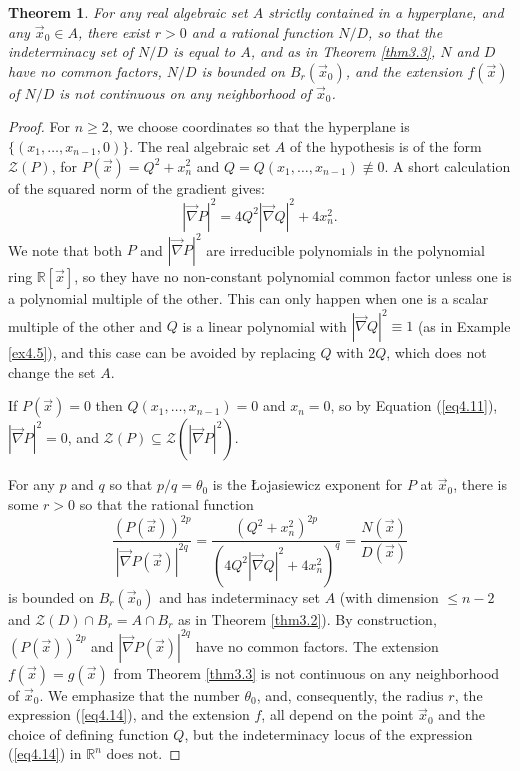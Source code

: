 \documentclass[12pt]{amsart}
\newtheorem{thm}{Theorem}[section]
\theoremstyle{definition}
\theoremstyle{remark}
\numberwithin{equation}{section}
\newcommand{\re}{\mathbb{R}}
\newcommand{\vv}{\mathcal{Z}}
\begin{document}
\begin{thm}\label{ex4.11}
  For any real algebraic set $A$ strictly contained in a hyperplane, and any $\vec x_0\in A$, there exist $r>0$ and a rational function $N/D$, so that the indeterminacy set of $N/D$ is equal to $A$, and as in Theorem {\rm{\ref{thm3.3}}}, $N$ and $D$ have no common factors, $N/D$ is bounded on $B_r(\vec x_0)$, and the extension $f(\vec x)$ of $N/D$ is not continuous on any neighborhood of $\vec x_0$.
\end{thm}
\begin{proof}
  For $n\ge2$, we choose coordinates so that the hyperplane is $\{(x_1,\ldots,x_{n-1},0)\}$.  The real algebraic set $A$ of the hypothesis is of the form $\vv(P)$, for $P(\vec x)=Q^2+x_n^2$ and $Q=Q(x_1,\ldots,x_{n-1})\not\equiv0$.  A short calculation of the squared norm of the gradient gives:
  \begin{equation}\label{eq4.11}
    |\vec\nabla P|^2=4Q^2|\vec\nabla Q|^2+4x_n^2.
  \end{equation}
  We note that both $P$ and $|\vec\nabla P|^2$ are irreducible polynomials in the polynomial ring $\re[\vec x]$, so they have no non-constant polynomial common factor unless one is a polynomial multiple of the other.  This can only happen when one is a scalar multiple of the other and $Q$ is a linear polynomial with $|\vec\nabla Q|^2\equiv1$ (as in Example \ref{ex4.5}), and this case can be avoided by replacing $Q$ with $2Q$, which does not change the set $A$.

  If $P(\vec x)=0$ then $Q(x_1,\ldots,x_{n-1})=0$ and $x_n=0$, so by Equation (\ref{eq4.11}), $|\vec\nabla P|^2=0$, and $\vv(P)\subseteq\vv(|\vec\nabla P|^2)$. 
  
    For any $p$ and $q$ so that $p/q=\theta_0$ is the \L ojasiewicz exponent for $P$ at $\vec x_0$, there is some $r>0$ so that the rational function \begin{equation}\label{eq4.14}
    \displaystyle{\frac{(P(\vec x))^{2p}}{|\vec\nabla P(\vec x)|^{2q}}}=\frac{(Q^2+x_n^2)^{2p}}{(4Q^2|\vec\nabla Q|^2+4x_n^2)^q}=\frac{N(\vec x)}{D(\vec x)}
    \end{equation}
    is bounded on $B_{r}(\vec x_0)$ and has indeterminacy set $A$ (with dimension $\le n-2$ and $\vv(D)\cap B_r=A\cap B_r$ as in Theorem \ref{thm3.2}).  By construction, $(P(\vec x))^{2p}$ and $|\vec\nabla P(\vec x)|^{2q}$ have no common factors.  The extension $f(\vec x)=g(\vec x)$ from Theorem \ref{thm3.3} is not continuous on any neighborhood of $\vec x_0$.  We emphasize that the number $\theta_0$, and, consequently, the radius $r$, the expression (\ref{eq4.14}), and the extension $f$, all depend on the point $\vec x_0$ and the choice of defining function $Q$, but the indeterminacy locus of the expression (\ref{eq4.14}) in $\re^n$ does not.
\end{proof}
\end{document}
